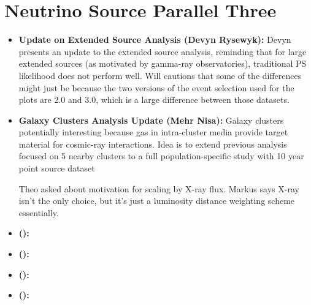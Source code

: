 \section*{Neutrino Source Parallel Three}
\begin{itemize}
    \item \textbf{Update on Extended Source Analysis (Devyn Rysewyk):} Devyn presents an update to the extended source analysis, reminding that for large extended sources (as motivated by gamma-ray observatories), traditional PS likelihood does not perform well. 
    Will cautions that some of the differences might just be because the two versions of the event selection used for the plots are 2.0 and 3.0, which is a large difference between those datasets. 
    \item \textbf{Galaxy Clusters Analysis Update (Mehr Nisa):} Galaxy clusters potentially interesting because gas in intra-cluster media provide target material for cosmic-ray interactions. Idea is to extend previous analysis focused on 5 nearby clusters to a full population-specific study with 10 year point source dataset
    
    Theo asked about motivation for scaling by X-ray flux. Markus says X-ray isn't the only choice, but it's just a luminosity distance weighting scheme essentially.
    \item \textbf{ ():}
    \item \textbf{ ():}
    \item \textbf{ ():}
    \item \textbf{ ():}
\end{itemize}

